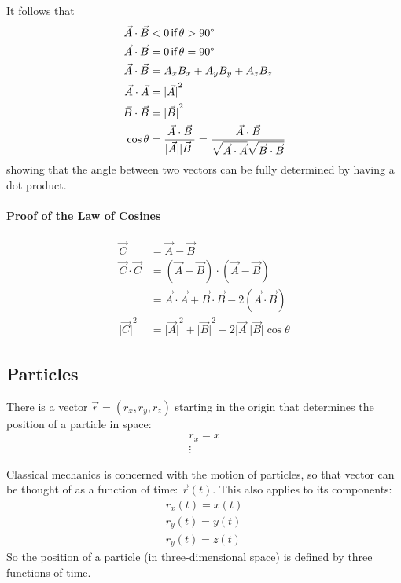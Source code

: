 \documentclass[pagesize,headsepline,10pt,parskip=half]{scrreprt}
\newcommand{\abs}[1]{\lvert#1\rvert}
\begin{document}
          It follows that
          \begin{align*}
            \vec A \cdot \vec B &< 0 \textsf{\,if\,} \theta > 90\degree \\
            \vec A \cdot \vec B &= 0 \textsf{\,if\,} \theta = 90\degree \\
            \vec A \cdot \vec B &= A_x B_x + A_y B_y + A_z B_z \\
            \vec A \cdot \vec A &= {\abs{\vec A}}^2 \\
            \vec B \cdot \vec B &= {\abs{\vec B}}^2 \\
            \cos{\theta} &= \frac{\vec A \cdot \vec B}{\abs{\vec A}
            \abs{\vec B}} = \frac{\vec A \cdot \vec B}{\sqrt{\vec A \cdot
              \vec A} \sqrt{\vec B \cdot \vec B}}
          \end{align*}
          showing that the angle between two vectors can be fully determined by
          having a dot product.

          \paragraph{Proof of the Law of Cosines}
            \begin{align*}
              \vec C &= \vec A - \vec B \\
              \vec C \cdot \vec C &= (\vec A - \vec B) \cdot (\vec A - \vec B)
              \\
              &= \vec A \cdot \vec A + \vec B \cdot \vec B - 2 (\vec A \cdot
              \vec B) \\
              {\abs{\vec C}}^2 &= {\abs{\vec A}}^2 + {\abs{\vec
              B}}^2 - 2 \abs{\vec A} \abs{\vec B}
              \cos{\theta}
            \end{align*}

      \subsection{Particles}
        There is a vector $\vec r = (r_x, r_y, r_z)$ starting in the origin that
        determines the position of a particle in space:
        \begin{align*}
          r_x = x \\
          \vdots
        \end{align*}

        Classical mechanics is concerned with the motion of particles, so that
        vector can be thought of as a function of time: $\vec r(t)$.  This also
        applies to its components:
        \begin{align*}
          r_x(t) = x(t) \\
          r_y(t) = y(t) \\
          r_y(t) = z(t)
        \end{align*}
        So the position of a particle (in three-dimensional space) is
        defined by three functions of time.
\end{document}
